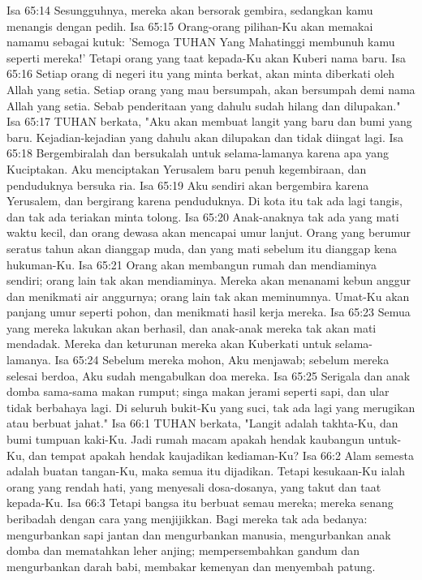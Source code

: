 Isa 65:14  Sesungguhnya, mereka akan bersorak gembira, sedangkan kamu menangis dengan pedih.
Isa 65:15  Orang-orang pilihan-Ku akan memakai namamu sebagai kutuk: 'Semoga TUHAN Yang Mahatinggi membunuh kamu seperti mereka!' Tetapi orang yang taat kepada-Ku akan Kuberi nama baru.
Isa 65:16  Setiap orang di negeri itu yang minta berkat, akan minta diberkati oleh Allah yang setia. Setiap orang yang mau bersumpah, akan bersumpah demi nama Allah yang setia. Sebab penderitaan yang dahulu sudah hilang dan dilupakan."
Isa 65:17  TUHAN berkata, "Aku akan membuat langit yang baru dan bumi yang baru. Kejadian-kejadian yang dahulu akan dilupakan dan tidak diingat lagi.
Isa 65:18  Bergembiralah dan bersukalah untuk selama-lamanya karena apa yang Kuciptakan. Aku menciptakan Yerusalem baru penuh kegembiraan, dan penduduknya bersuka ria.
Isa 65:19  Aku sendiri akan bergembira karena Yerusalem, dan bergirang karena penduduknya. Di kota itu tak ada lagi tangis, dan tak ada teriakan minta tolong.
Isa 65:20  Anak-anaknya tak ada yang mati waktu kecil, dan orang dewasa akan mencapai umur lanjut. Orang yang berumur seratus tahun akan dianggap muda, dan yang mati sebelum itu dianggap kena hukuman-Ku.
Isa 65:21  Orang akan membangun rumah dan mendiaminya sendiri; orang lain tak akan mendiaminya. Mereka akan menanami kebun anggur dan menikmati air anggurnya; orang lain tak akan meminumnya. Umat-Ku akan panjang umur seperti pohon, dan menikmati hasil kerja mereka.
Isa 65:23  Semua yang mereka lakukan akan berhasil, dan anak-anak mereka tak akan mati mendadak. Mereka dan keturunan mereka akan Kuberkati untuk selama-lamanya.
Isa 65:24  Sebelum mereka mohon, Aku menjawab; sebelum mereka selesai berdoa, Aku sudah mengabulkan doa mereka.
Isa 65:25  Serigala dan anak domba sama-sama makan rumput; singa makan jerami seperti sapi, dan ular tidak berbahaya lagi. Di seluruh bukit-Ku yang suci, tak ada lagi yang merugikan atau berbuat jahat."
Isa 66:1  TUHAN berkata, "Langit adalah takhta-Ku, dan bumi tumpuan kaki-Ku. Jadi rumah macam apakah hendak kaubangun untuk-Ku, dan tempat apakah hendak kaujadikan kediaman-Ku?
Isa 66:2  Alam semesta adalah buatan tangan-Ku, maka semua itu dijadikan. Tetapi kesukaan-Ku ialah orang yang rendah hati, yang menyesali dosa-dosanya, yang takut dan taat kepada-Ku.
Isa 66:3  Tetapi bangsa itu berbuat semau mereka; mereka senang beribadah dengan cara yang menjijikkan. Bagi mereka tak ada bedanya: mengurbankan sapi jantan dan mengurbankan manusia, mengurbankan anak domba dan mematahkan leher anjing; mempersembahkan gandum dan mengurbankan darah babi, membakar kemenyan dan menyembah patung.
